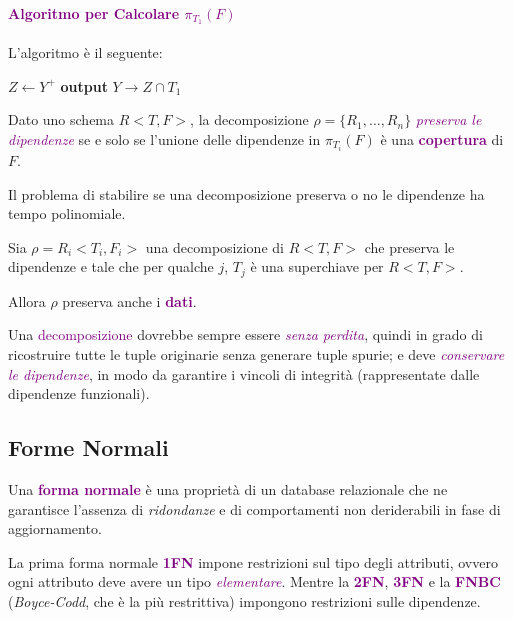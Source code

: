 \paragraph{\textcolor{purple}{Algoritmo per Calcolare $\pi_{T_1}(F)$}}
L'algoritmo è il seguente:
\begin{algorithm}
    \begin{algorithmic}
            \State $Z \gets Y^+$
            \State \textbf{output} $Y \rightarrow Z \cap T_1$
        \EndFor
    \end{algorithmic}
\end{algorithm}

\begin{definition}
    Dato uno schema $R<T,F>$, la decomposizione $\rho = \{R_1, \dots, R_n\}$
    \emph{\textcolor{purple}{preserva le dipendenze}} se e solo se l'unione delle
    dipendenze in $\pi_{T_i}(F)$ è una \textbf{\textcolor{purple}{copertura}} di $F$.

    Il problema di stabilire se una decomposizione preserva o no le dipendenze ha tempo polinomiale.
\end{definition}

\begin{theorem}
    Sia $\rho = {R_i<T_i, F_i>}$ una decomposizione di $R<T, F>$ che preserva
    le dipendenze e tale che per qualche $j$, $T_j$ è una superchiave per $R<T,F>$.

    Allora $\rho$ preserva anche i \textbf{\textcolor{purple}{dati}}.
\end{theorem}

Una \textcolor{purple}{decomposizione} dovrebbe sempre essere \emph{\textcolor{purple}{senza perdita}},
quindi in grado di ricostruire tutte le tuple originarie senza generare tuple spurie; e deve \emph{\textcolor{purple}{conservare le dipendenze}},
in modo da garantire i vincoli di integrità (rappresentate dalle dipendenze funzionali).

\subsection{Forme Normali}

\begin{definition}
    Una \textbf{\textcolor{purple}{forma normale}} è una proprietà di un database relazionale che
    ne garantisce l'assenza di \emph{ridondanze} e di comportamenti non deriderabili in fase di aggiornamento.
    
    La prima forma normale \textbf{\textcolor{purple}{1FN}} impone restrizioni sul tipo degli attributi, ovvero ogni attributo
    deve avere un tipo \emph{\textcolor{purple}{elementare}}. Mentre
    la \textbf{\textcolor{purple}{2FN}}, \textbf{\textcolor{purple}{3FN}} e la
    \textbf{\textcolor{purple}{FNBC}} (\emph{Boyce-Codd}, che è la più restrittiva) impongono
    restrizioni sulle dipendenze.
\end{definition}

